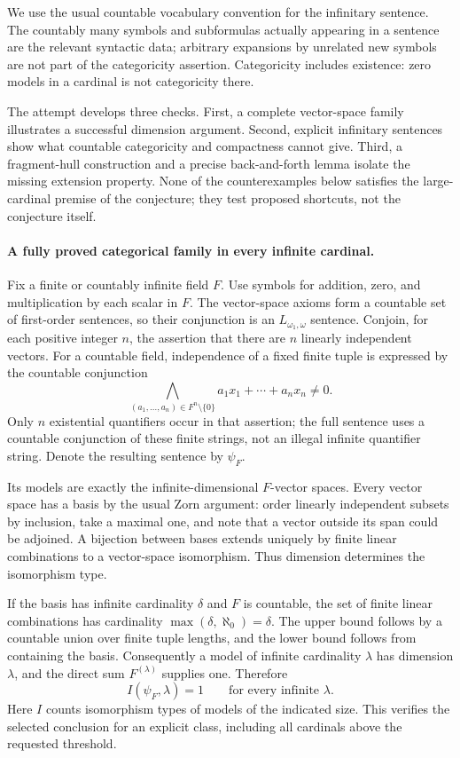 \documentclass[11pt]{article}
\begin{document}
We use the usual countable vocabulary convention for the infinitary
sentence. The countably many symbols and subformulas actually appearing
in a sentence are the relevant syntactic data; arbitrary expansions
by unrelated new symbols are not part of the categoricity assertion.
Categoricity includes existence: zero models in a cardinal is not
categoricity there.

The attempt develops three checks. First, a complete vector-space
family illustrates a successful dimension argument. Second, explicit
infinitary sentences show what countable categoricity and compactness
cannot give. Third, a fragment-hull construction and a precise
back-and-forth lemma isolate the missing extension property. None
of the counterexamples below satisfies the large-cardinal premise of
the conjecture; they test proposed shortcuts, not the conjecture itself.

\paragraph{A fully proved categorical family in every infinite cardinal.}
Fix a finite or countably infinite field $F$. Use symbols for addition,
zero, and multiplication by each scalar in $F$. The vector-space axioms
form a countable set of first-order sentences, so their conjunction is
an $L_{\omega_1,\omega}$ sentence. Conjoin, for each positive integer
$n$, the assertion that there are $n$ linearly independent vectors.
For a countable field, independence of a fixed finite tuple is expressed
by the countable conjunction
\[
 \bigwedge_{(a_1,\ldots,a_n)\in F^n\setminus\{0\}}
                     a_1x_1+\cdots+a_nx_n\ne0.
\]
Only $n$ existential quantifiers occur in that assertion; the full
sentence uses a countable conjunction of these finite strings, not
an illegal infinite quantifier string. Denote the resulting sentence
by $\psi_F$.

Its models are exactly the infinite-dimensional $F$-vector spaces.
Every vector space has a basis by the usual Zorn argument: order linearly
independent subsets by inclusion, take a maximal one, and note that a
vector outside its span could be adjoined. A bijection between bases
extends uniquely by finite linear combinations to a vector-space
isomorphism. Thus dimension determines the isomorphism type.

If the basis has infinite cardinality $\delta$ and $F$ is countable,
the set of finite linear combinations has cardinality
$\max(\delta,\aleph_0)=\delta$. The upper bound follows by a countable
union over finite tuple lengths, and the lower bound follows from
containing the basis. Consequently a model of infinite cardinality
$\lambda$ has dimension $\lambda$, and the direct sum
$F^{(\lambda)}$ supplies one. Therefore
\[
 I(\psi_F,\lambda)=1\qquad\text{for every infinite }\lambda.
 \tag{370.1}
\]
Here $I$ counts isomorphism types of models of the indicated size.
This verifies the selected conclusion for an explicit class, including
all cardinals above the requested threshold.
\end{document}
